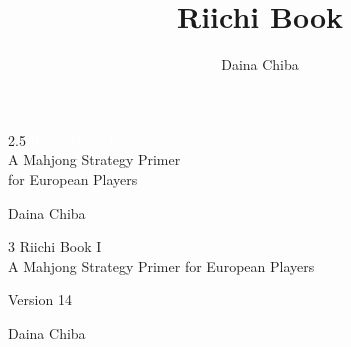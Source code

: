 \documentclass{book}
\title{Riichi Book}
\author{Daina Chiba}
\newcommand{\theversion}{14}
\begin{document}
\frontmatter
{}

\thispagestyle{empty}


\begin{flushleft}

\vspace*{.24\paperheight}

\begin{spacing}{2.5}
\textcolor{White}{\fontsize{2.0cm}{3.6em}\scshape Riichi Book I}\\
{\LARGE A Mahjong Strategy Primer\\for European Players}
\end{spacing}

\vspace*{.08\paperheight}
\hfill {\LARGE Daina Chiba}

\end{flushleft}

\restoregeometry


\thispagestyle{empty}
\mbox{}\newpage

\thispagestyle{empty}
\setcounter{page}{1}
\pagebreak
\onehalfspacing

\begin{flushright}

\vspace*{.18\paperheight}

\begin{spacing}{3}
{\Huge Riichi Book I}\\
{\Large A Mahjong Strategy Primer for European Players}
\end{spacing}

\vspace*{.11\textheight} 

{\Large Version \theversion}\\

\vspace*{.07\textheight} 

{\Large
Daina Chiba\\
}

\vfill

\end{flushright}

\pagebreak
\end{document}
